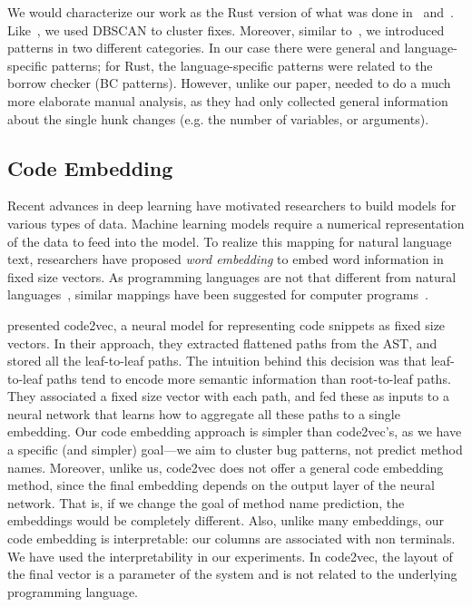 We would characterize our work as the Rust version of what was done in~\cite{hanam2016discovering} and~\cite{yang2022mining}. Like~\cite{hanam2016discovering}, we used DBSCAN to cluster fixes. Moreover, similar to~\cite{yang2022mining}, we introduced patterns in two different categories. In our case there were general and language-specific patterns; for Rust, the language-specific patterns were related to the borrow checker (BC patterns). However, unlike our paper, \cite{yang2022mining} needed to do a much more elaborate manual analysis, as they had only collected general information about the single hunk changes (e.g. the number of variables, or arguments).

\subsection{Code Embedding}

Recent advances in deep learning have motivated researchers to build models for various types of data. Machine learning models require a numerical representation of the data to feed into the model. To realize this mapping for natural language text, researchers have proposed \emph{word embedding} to embed word information in fixed size vectors. As programming languages are not that different from natural languages~\citep{hindle2016naturalness}, similar mappings have been suggested for computer programs~\citep{chen2019literature}.

\cite{alon2019code2vec} presented code2vec, a neural model for representing code snippets as fixed size vectors. In their approach, they extracted flattened paths from the AST, and stored all the leaf-to-leaf paths. The intuition behind this decision was that leaf-to-leaf paths tend to encode more semantic information than root-to-leaf paths. They associated a fixed size vector with each path, and fed these as inputs to a neural network that learns how to aggregate all these paths to a single embedding. Our code embedding approach is simpler than code2vec's, as we have a specific (and simpler) goal---we aim to cluster bug patterns, not predict method names. Moreover, unlike us, code2vec does not offer a general code embedding method, since the final embedding depends on the output layer of the neural network. That is, if we change the goal of method name prediction, the embeddings would be completely different. Also, unlike many embeddings, our code embedding is interpretable: our columns are associated with non terminals. We have used the interpretability in our experiments. In code2vec, the layout of the final vector is a parameter of the system and  is not related to the underlying programming language.


